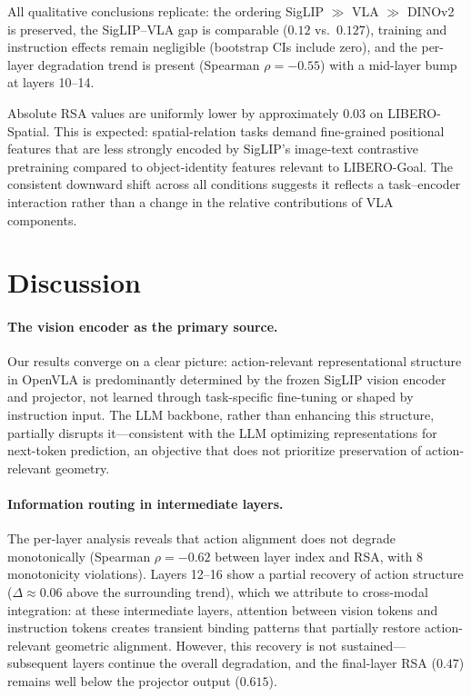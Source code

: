 \documentclass[letterpaper]{article}
\begin{document}
All qualitative conclusions replicate: the ordering SigLIP $\gg$ VLA $\gg$ DINOv2 is preserved, the SigLIP--VLA gap is comparable ($0.12$ vs.\ $0.127$), training and instruction effects remain negligible (bootstrap CIs include zero), and the per-layer degradation trend is present (Spearman $\rho=-0.55$) with a mid-layer bump at layers 10--14.

Absolute RSA values are uniformly lower by approximately $0.03$ on LIBERO-Spatial.
This is expected: spatial-relation tasks demand fine-grained positional features that are less strongly encoded by SigLIP's image-text contrastive pretraining compared to object-identity features relevant to LIBERO-Goal.
The consistent downward shift across all conditions suggests it reflects a task--encoder interaction rather than a change in the relative contributions of VLA components.

\section{Discussion}
\label{sec:discussion}

\paragraph{The vision encoder as the primary source.}
Our results converge on a clear picture: action-relevant representational structure in OpenVLA is predominantly determined by the frozen SigLIP vision encoder and projector, not learned through task-specific fine-tuning or shaped by instruction input.
The LLM backbone, rather than enhancing this structure, partially disrupts it---consistent with the LLM optimizing representations for next-token prediction, an objective that does not prioritize preservation of action-relevant geometry.

\paragraph{Information routing in intermediate layers.}
The per-layer analysis reveals that action alignment does not degrade monotonically (Spearman $\rho=-0.62$ between layer index and RSA, with 8 monotonicity violations).
Layers 12--16 show a partial recovery of action structure ($\Delta\approx0.06$ above the surrounding trend), which we attribute to cross-modal integration: at these intermediate layers, attention between vision tokens and instruction tokens creates transient binding patterns that partially restore action-relevant geometric alignment.
However, this recovery is not sustained---subsequent layers continue the overall degradation, and the final-layer RSA ($0.47$) remains well below the projector output ($0.615$).
\end{document}
